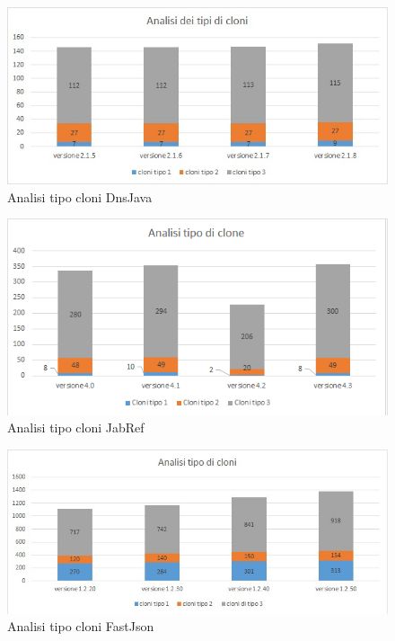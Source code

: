 \begin{figure}[h]
	\centering
	\includegraphics[scale=0.7, trim = 0cm 0cm 0cm 0cm, clip=true]{Grafici_dnsJava/TipiCloni.jpg}
	\caption{Analisi tipo cloni DnsJava}
	\label{fig:tipiCloniDnsJava}	
\end{figure}
\begin{figure}[h]
	\centering
	\includegraphics[scale=0.7, trim = 0cm 0cm 0cm 0cm, clip=true]{Grafici_jabRef/TipiCloni.png}
	\caption{Analisi tipo cloni JabRef}
	\label{fig:tipiCloniJabRef}
\end{figure}
\begin{figure}[h]
	\centering
	\includegraphics[scale=0.58, trim = 0cm 0cm 0cm 0cm, clip=true]{Grafici_fastJson/TipiCloni.jpg}
	\caption{Analisi tipo cloni FastJson}
	\label{fig:tipiCloniFastjson}
\end{figure}
